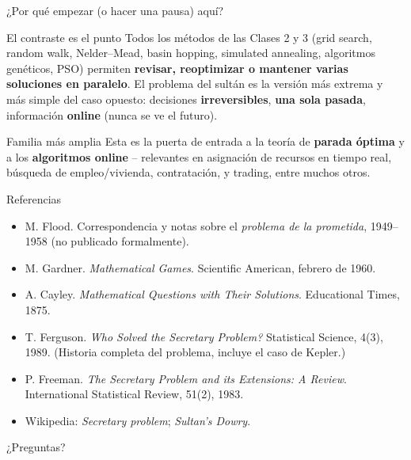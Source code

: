 \documentclass[aspectratio=169,10pt]{beamer}
\begin{document}
\begin{frame}{¿Por qué empezar (o hacer una pausa) aquí?}
  \begin{block}{El contraste es el punto}
    Todos los métodos de las Clases 2 y 3 (grid search, random walk,
    Nelder--Mead, basin hopping, simulated annealing, algoritmos
    genéticos, PSO) permiten \textbf{revisar, reoptimizar o mantener
    varias soluciones en paralelo}. El problema del sultán es la
    versión más extrema y más simple del caso opuesto: decisiones
    \textbf{irreversibles}, \textbf{una sola pasada}, información
    \textbf{online} (nunca se ve el futuro).
  \end{block}
  \begin{exampleblock}{Familia más amplia}
    Esta es la puerta de entrada a la teoría de \textbf{parada
    óptima} y a los \textbf{algoritmos online} -- relevantes en
    asignación de recursos en tiempo real, búsqueda de empleo/vivienda,
    contratación, y trading, entre muchos otros.
  \end{exampleblock}
\end{frame}

\begin{frame}{Referencias}
  \footnotesize
  \begin{itemize}
    \item M. Flood. Correspondencia y notas sobre el \emph{problema de la
      prometida}, 1949--1958 (no publicado formalmente).
    \item M. Gardner. \emph{Mathematical Games}. Scientific American,
      febrero de 1960.
    \item A. Cayley. \emph{Mathematical Questions with Their Solutions}.
      Educational Times, 1875.
    \item T. Ferguson. \emph{Who Solved the Secretary Problem?}
      Statistical Science, 4(3), 1989. (Historia completa del
      problema, incluye el caso de Kepler.)
    \item P. Freeman. \emph{The Secretary Problem and its Extensions: A
      Review}. International Statistical Review, 51(2), 1983.
    \item Wikipedia: \emph{Secretary problem}; \emph{Sultan's Dowry}.
  \end{itemize}
\end{frame}

\begin{frame}[standout]
  ¿Preguntas?
\end{frame}
\end{document}
